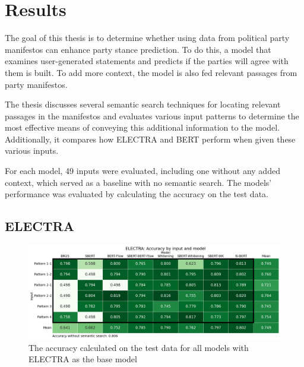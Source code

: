 \chapter{Results}\label{results}

The goal of this thesis is to determine whether using data from political party manifestos can enhance party stance prediction. To do this, a model that examines user-generated statements and predicts if the parties will agree with them is built. To add more context, the model is also fed relevant passages from party manifestos.

The thesis discusses several semantic search techniques for locating relevant passages in the manifestos and evaluates various input patterns to determine the most effective means of conveying this additional information to the model. Additionally, it compares how ELECTRA \citep{clark2020electra} and BERT \citep{devlin2018bert} perform when given these various inputs.

For each model, 49 inputs were evaluated, including one without any added context, which served as a baseline with no semantic search. The models' performance was evaluated by calculating the accuracy on the test data.

\section{ELECTRA}

\begin{figure}[h]
\centering
\includegraphics[width = 1\linewidth]{figures/electra_accuracy.png}
\caption{The accuracy calculated on the test data for all models with ELECTRA as the base model}
\label{fig:electra_accuracy}
\end{figure}


